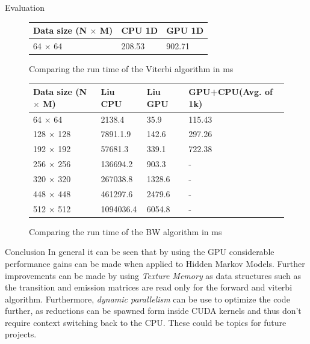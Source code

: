 \documentclass[11pt]{beamer}
\begin{document}
\begin{frame}{Evaluation}
\begin{figure}[H]
\centering
\begin{tabular}{|l|l|l|}
\hline
Data size (N $\times$ M) & CPU 1D & GPU 1D \\ \hline
64 $\times$ 64 & 208.53 & 902.71 \\ \hline

\end{tabular}

\caption{Comparing the run time of the Viterbi algorithm in ms}
\end{figure}
\end{frame}

\begin{frame}
\begin{figure}[H]
\centering
\begin{tabular}{|l|l|l|l|}
\hline
Data size (N $\times$ M) & Liu CPU & Liu GPU &GPU+CPU(Avg. of 1k)\\ \hline
64 $\times$ 64 & 2138.4 & 35.9 & 115.43 \\ \hline
128 $\times$ 128 & 7891.1.9 & 142.6 & 297.26 \\ \hline
192 $\times$ 192 & 57681.3 & 339.1 & 722.38 \\ \hline
256 $\times$ 256 & 136694.2 & 903.3 & - \\ \hline
320 $\times$ 320 & 267038.8 & 1328.6 & - \\ \hline
448 $\times$ 448 & 461297.6 & 2479.6 & - \\ \hline
512 $\times$ 512 & 1094036.4 & 6054.8 & - \\ \hline

\end{tabular}

\caption{Comparing the run time of the BW algorithm in ms}
\end{figure}
\end{frame}

\begin{frame}{Conclusion}
In general it can be seen that by using the GPU considerable performance gains can be made when applied to Hidden Markov Models. Further improvements can be made by using \textit{Texture Memory} \cite{cuhmm} as data structures such as the transition and emission matrices are read only for the forward and viterbi algorithm. Furthermore, \textit{dynamic parallelism} can be use to optimize the code further, as reductions can be spawned form inside CUDA kernels and thus don't require context switching back to the CPU. These could be topics for future projects.

\end{frame}
\end{document}
